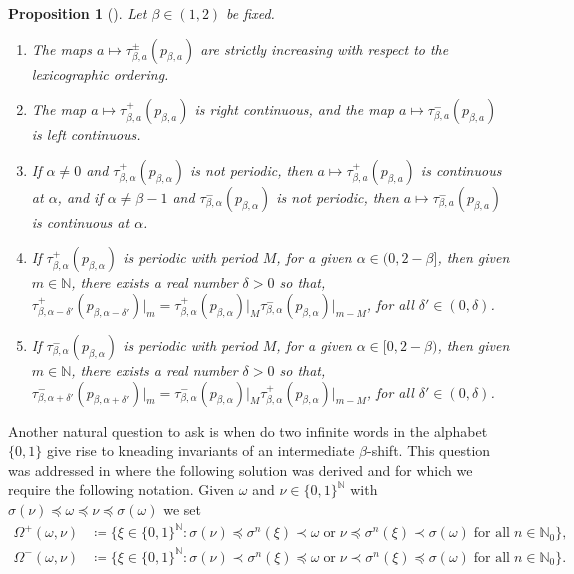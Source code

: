 \documentclass[a4paper,reqno,10pt]{amsart}
\newtheorem{proposition}[theorem]{Proposition}
\begin{document}
    \begin{proposition}[{\cite{BHV:2011,Cooperband2018ContinuityOE}}]\label{prop:mon_cont_kneading}
        Let $\beta \in (1,2)$ be fixed.
            \begin{enumerate}[label={\rm(\arabic*)}]
                \item The maps $a \mapsto \tau_{\beta,a}^{\pm}(p_{\beta, a})$ are strictly increasing with respect to the lexicographic ordering.
                \item The map $a \mapsto \tau_{\beta, a}^{+}(p_{\beta, a})$ is right continuous, and the map $a \mapsto \tau_{\beta,a}^{-}(p_{\beta, a})$ is left continuous.
                \item If $\alpha \neq 0$ and $\tau_{\beta, \alpha}^{+}(p_{\beta, \alpha})$ is not periodic, then $a \mapsto \tau_{\beta,a}^{+}(p_{\beta, a})$ is continuous at $\alpha$, and if $\alpha \neq \beta-1$ and $\tau_{\beta,\alpha}^{-}(p_{\beta, \alpha})$ is not periodic, then $a \mapsto \tau_{\beta,a}^{-}(p_{\beta, a})$ is continuous at $\alpha$.
                \item If $\tau_{\beta,\alpha}^{+}(p_{\beta, \alpha})$ is periodic with period $M$, for a given $\alpha \in (0, 2-\beta]$, then given $m \in \mathbb{N}$, there exists a real number $\delta > 0$ so that, $\tau_{\beta,\alpha-\delta'}^{+}(p_{\beta, \alpha-\delta'})\vert_{m} = \tau_{\beta,\alpha}^{+}(p_{\beta, \alpha})\vert_{M}\tau_{\beta,\alpha}^{-}(p_{\beta, \alpha})\vert_{m-M}$, for all $\delta' \in (0, \delta)$. 
                \item If $\tau_{\beta,\alpha}^{-}(p_{\beta, \alpha})$ is periodic with period $M$, for a given $\alpha \in [0, 2-\beta)$, then given $m \in \mathbb{N}$, there exists a real number $\delta > 0$ so that, $\tau_{\beta,\alpha+\delta'}^{-}(p_{\beta, \alpha+\delta'})\vert_{m} = \tau_{\beta,\alpha}^{-}(p_{\beta, \alpha})\vert_{M}\tau_{\beta,\alpha}^{+}(p_{\beta, \alpha})\vert_{m-M}$, for all $\delta'  \in (0, \delta)$.
            \end{enumerate}
    \end{proposition}

Another natural question to ask is when do two infinite words in the alphabet $\{0, 1\}$ give rise to kneading invariants of an intermediate $\beta$-shift. This question was addressed in \cite{barnsley_steiner_vince_2014} where the following solution was derived and for which we require the following notation. Given $\omega$ and $\nu \in \{0,1\}^\mathbb{N}$ with $\sigma(\nu) \preceq \omega \preceq \nu \preceq \sigma(\omega)$ we set
    \begin{align*}
        \Omega^{+}(\omega,\nu) &\coloneqq \{ \xi \in \{0,1\}^{\mathbb{N}} \colon \sigma(\nu) \preceq \sigma^{n}(\xi) \prec \omega \; \text{or} \; \nu \preceq \sigma^{n}(\xi) \prec \sigma(\omega) \; \text{for all} \; n \in \mathbb{N}_{0} \},\\
        \Omega^{-}(\omega,\nu) &\coloneqq \{ \xi \in \{0,1\}^{\mathbb{N}} \colon \sigma(\nu) \prec \sigma^n(\xi) \preceq \omega \; \text{or} \; \nu \prec \sigma^{n} (\xi) \preceq \sigma(\omega) \; \text{for all} \; n \in \mathbb{N}_{0} \}.
    \end{align*}
\end{document}
